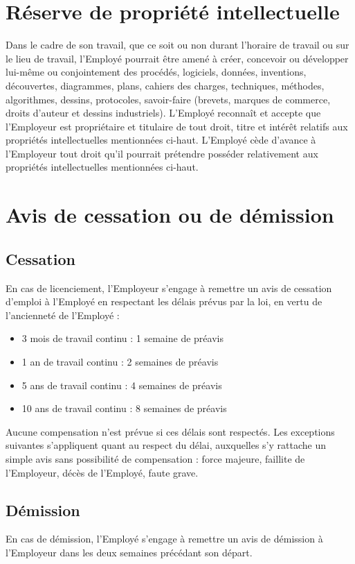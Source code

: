 \documentclass{article}
\begin{document}
    \section{Réserve de propriété intellectuelle}
    Dans le cadre de son travail, que ce soit ou non durant l'horaire de travail ou sur le lieu de travail, l'Employé pourrait être amené à créer, concevoir ou développer lui-même ou conjointement des procédés, logiciels, données, inventions, découvertes, diagrammes, plans, cahiers des charges, techniques, méthodes, algorithmes, dessins, protocoles, savoir-faire (brevets, marques de commerce, droits d'auteur et dessins industriels).
        L'Employé reconnaît et accepte que l'Employeur est propriétaire et titulaire de tout droit, titre et intérêt relatifs aux propriétés intellectuelles mentionnées ci-haut.
        L'Employé cède d'avance à l'Employeur tout droit qu'il pourrait prétendre posséder relativement aux propriétés intellectuelles mentionnées ci-haut.
    
    \section{Avis de cessation ou de démission}
    	\subsection{Cessation}
	    En cas de licenciement, l'Employeur s'engage à remettre un avis de cessation d'emploi à l'Employé en respectant les délais prévus par la loi, en vertu de l'ancienneté de l'Employé :
	    
	    \begin{itemize}
	    	\item 3 mois de travail continu : 1 semaine de préavis
	    	\item 1 an de travail continu : 2 semaines de préavis
	    	\item 5 ans de travail continu : 4 semaines de préavis
	    	\item 10 ans de travail continu : 8 semaines de préavis
	    \end{itemize} \bigskip
	    
	    Aucune compensation n'est prévue si ces délais sont respectés. Les exceptions suivantes s'appliquent quant au respect du délai, auxquelles s'y rattache un simple avis sans possibilité de compensation : force majeure, faillite de l'Employeur, décès de l'Employé, faute grave.
			    	
    	\subsection{Démission}
	    En cas de démission, l'Employé s'engage à remettre un avis de démission à l'Employeur dans les deux semaines précédant son départ.
    
\end{document}
